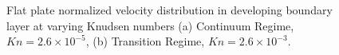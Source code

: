\documentclass[titlepage,11pt,letterpaper]{article}
\begin{document}
\begin{figure}[t]
  \begin{center}
    \caption{ 
      Flat plate normalized velocity distribution in developing boundary layer at varying Knudsen numbers
      (a) Continuum Regime, $Kn=2.6\times 10^{-5}$,  
      (b) Transition Regime, $Kn=2.6\times 10^{-3}$.
    }
    \label{fig:flatplate_BL}
  \end{center}    
\end{figure}
%
\end{document}
